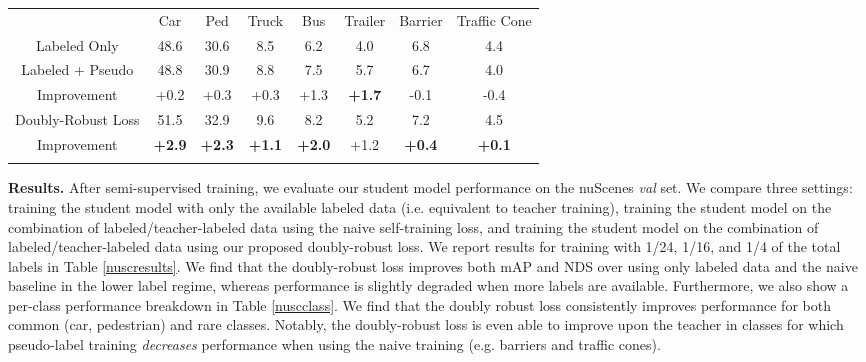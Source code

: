 \begin{table*}
\centering
\small
\setlength{\tabcolsep}{8.5pt}
\renewcommand\arraystretch{1.05}
\caption{Per-class mAP (\%) comparison on nuScenes \textit{val} set using 1/16 of total labels in training.}
\vspace{-0.08in}
\begin{tabular}{c||c | c | c | c | c | c | c}
\shline
 & Car & Ped & Truck & Bus & Trailer & Barrier & Traffic Cone\\
 \shline
 Labeled Only & 48.6 & 30.6 & 8.5 & 6.2 & 4.0 & 6.8 & 4.4\\
 \hline
 Labeled + Pseudo & 48.8 & 30.9 & 8.8 & 7.5 & 5.7 & 6.7 & 4.0\\
 Improvement & +0.2 & +0.3 & +0.3 & +1.3 & \textbf{+1.7} & -0.1 & -0.4\\
 \hline
 Doubly-Robust Loss & 51.5 & 32.9 &  9.6 & 8.2 & 5.2 & 7.2 & 4.5   \\
 Improvement & \textbf{+2.9} & \textbf{+2.3} & \textbf{+1.1}  & \textbf{+2.0} & +1.2 & \textbf{+0.4} &  \textbf{+0.1}  \\
 \shline
\end{tabular}
\label{nuscclass}
\vspace{-12pt}
\end{table*}

\noindent \textbf{Results.}
After semi-supervised training, we evaluate our student model performance on the nuScenes \textit{val} set. We compare three settings: training the student model with only the available labeled data (i.e. equivalent to teacher training), training the student model on the combination of labeled/teacher-labeled data using the naive self-training loss, and training the student model on the combination of labeled/teacher-labeled data using our proposed doubly-robust loss. We report results for training with 1/24, 1/16, and 1/4 of the total labels in Table \ref{nuscresults}. We find that the doubly-robust loss improves both mAP and NDS over using only labeled data and the naive baseline in the lower label regime, whereas performance is slightly degraded when more labels are available. Furthermore, we also show a per-class performance breakdown in Table \ref{nuscclass}. We find that the doubly robust loss consistently improves performance for both common (car, pedestrian) and rare classes. Notably, the doubly-robust loss is even able to improve upon the teacher in classes for which pseudo-label training \textit{decreases} performance when using the naive training (e.g. barriers and traffic cones).



